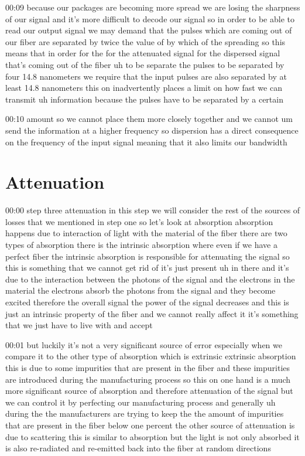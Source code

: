 00:09
because our packages are becoming more spread we are losing the sharpness of
our signal and it's more difficult to decode our signal
so in order to be able to read our output signal we may demand that the pulses
which are coming out of our fiber are separated by
twice the value of by which of the spreading so this means that in order
for the for the attenuated signal for the dispersed signal that's coming
out of the fiber uh to be separate the pulses to be
separated by four 14.8 nanometers we require that the input
pulses are also separated by at least 14.8 nanometers this on
inadvertently places a limit on how fast we can
transmit uh information because the pulses have to be separated by a certain

00:10
amount so we cannot place them more closely together and we cannot
um send the information at a higher frequency
so dispersion has a direct consequence on the frequency of the input signal
meaning that it also limits our bandwidth

\section{Attenuation}

00:00
step three attenuation in this step we will consider the rest
of the sources of losses that we mentioned in step one
so let's look at absorption absorption happens due to interaction of light with
the material of the fiber there are two types of absorption there
is the intrinsic absorption where even if we have a perfect fiber
the intrinsic absorption is responsible for attenuating
the signal so this is something that we cannot get rid of
it's just present uh in there and it's due to the interaction between the
photons of the signal and the electrons in the material
the electrons absorb the photons from the signal and they become
excited therefore the overall signal the power of the signal decreases and
this is just an intrinsic property of the fiber and we cannot really affect it
it's something that we just have to live with and accept

00:01
but luckily it's not a very significant source of error
especially when we compare it to the other type of absorption
which is extrinsic extrinsic absorption this is due to some impurities that are
present in the fiber and these impurities are introduced
during the manufacturing process so this on one hand is a much more
significant source of absorption and therefore attenuation of the signal
but we can control it by perfecting our manufacturing process
and generally uh during the the manufacturers are trying to keep
the the amount of impurities that are present in the fiber below one percent
the other source of attenuation is due to scattering
this is similar to absorption but the light is not only absorbed it is
also re-radiated and re-emitted back into the fiber at random directions

